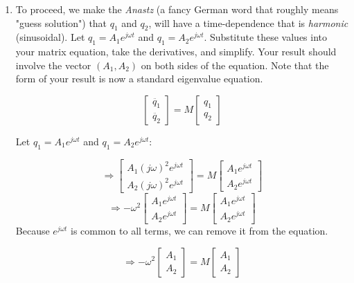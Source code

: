 \documentclass[fleqn]{article}
\begin{document}
\begin{enumerate}[nolistsep]
\begin{enumerate}[nolistsep]
				\item To proceed, we make the \textit{Anastz} (a fancy German word that roughly means "guess solution") that $q_1$ and $q_2$, will have a time-dependence that is \textit{harmonic} (sinusoidal). Let $q_1 = A_1e^{j{\omega}t}$ and $q_1 = A_2e^{j{\omega}t}$. Substitute these values into your matrix equation, take the derivatives, and simplify. Your result should involve the vector $(A_1, A_2)$ on both sides of the equation. Note that the form of your result is now a standard eigenvalue equation.
				
				\begin{equation*}
					\begin{bmatrix}\ddot{q_1} \\ \ddot{q_2}\end{bmatrix} = M\begin{bmatrix}q_1 \\ q_2\end{bmatrix}
				\end{equation*}
				
				Let $q_1 = A_1e^{j{\omega}t}$ and $q_1 = A_2e^{j{\omega}t}$:
				
				\begin{equation*}
					\Rightarrow \begin{bmatrix}A_1(j\omega)^2e^{j{\omega}t} \\ A_2(j\omega)^2e^{j{\omega}t}\end{bmatrix} = M\begin{bmatrix}A_1e^{j{\omega}t} \\ A_2e^{j{\omega}t}\end{bmatrix}
				\end{equation*}
				\begin{equation*}
					\Rightarrow - {\omega}^2\begin{bmatrix} A_1e^{j{\omega}t} \\ A_2e^{j{\omega}t}\end{bmatrix} = M\begin{bmatrix}A_1e^{j{\omega}t} \\ A_2e^{j{\omega}t}\end{bmatrix}
				\end{equation*}
				\newpage
				Because $e^{j{\omega}t}$ is common to all terms, we can remove it from the equation.
				
				\begin{equation*}
					\Rightarrow - {\omega}^2\begin{bmatrix} A_1 \\ A_2\end{bmatrix} = M\begin{bmatrix}A_1 \\ A_2\end{bmatrix}
				\end{equation*}
				

\end{enumerate}
\end{enumerate}
\end{document}
